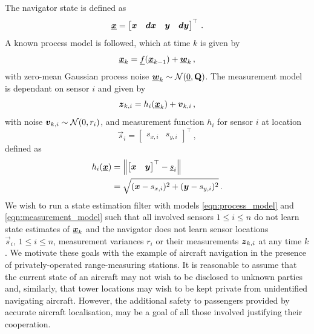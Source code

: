 \documentclass[10pt,journal,compsoc]{IEEEtran}
\theoremstyle{definition}
\theoremstyle{definition}
\theoremstyle{remark}
\begin{document}
The navigator state is defined as 
\begin{equation}
    \rvec{x} = 
    \begin{bmatrix}
        \rv{x} & \rv{dx} & \rv{y} & \rv{dy}
    \end{bmatrix}^\top\,. \label{eqn:state_def}
\end{equation}
A known process model is followed, which at time $k$ is given by
\begin{equation}
    \rvec{x}_k = \vec{f}(\rvec{x}_{k-1})+\rvec{w}_k\,, \label{eqn:process_model}
\end{equation}
with zero-mean Gaussian process noise ${\boldsymbol{\underline{w}}}_k \sim \mathcal{N}({\underline{0}},{{\mathbf{Q}}})$. The measurement model is dependant on sensor $i$ and given by
\begin{equation}
    \rv{z}_{k,i} = h_i(\rvec{x}_k)+\rv{v}_{k,i}\,, \label{eqn:measurement_model}
\end{equation}
with noise ${\boldsymbol{v}}_{k,i} \sim \mathcal{N}(0,r_i)$, and measurement function $h_i$ for sensor $i$ at location
\begin{equation}
    \vec{s}_i = 
    \begin{bmatrix}
        s_{x,i} & s_{y,i}
    \end{bmatrix}^\top\,,
\end{equation} 
defined as
\begin{equation}
    \begin{split}
        h_i({\boldsymbol{\underline{x}}}) &= \left\lVert
        \begin{bmatrix}
            {\boldsymbol{x}} & {\boldsymbol{y}}
        \end{bmatrix}^\top
        - {\underline{s}}_{i}\right\rVert \\
        &= \sqrt{({\boldsymbol{x}}-s_{x,i})^2 + ({\boldsymbol{y}}-s_{y,i})^2}\,.
    \end{split}
\end{equation}
We wish to run a state estimation filter with models \eqref{eqn:process_model} and \eqref{eqn:measurement_model} such that all involved sensors $1 \leq i \leq n$ do not learn state estimates of ${\boldsymbol{\underline{x}}}_{k}$ and the navigator does not learn sensor locations $\vec{s}_i,\,1 \leq i \leq n$, measurement variances $r_i$ or their measurements ${\boldsymbol{z}}_{k,i}$ at any time $k$. We motivate these goals with the example of aircraft navigation in the presence of privately-operated range-measuring stations. It is reasonable to assume that the current state of an aircraft may not wish to be disclosed to unknown parties and, similarly, that tower locations may wish to be kept private from unidentified navigating aircraft. However, the additional safety to passengers provided by accurate aircraft localisation, may be a goal of all those involved justifying their cooperation.
\end{document}
